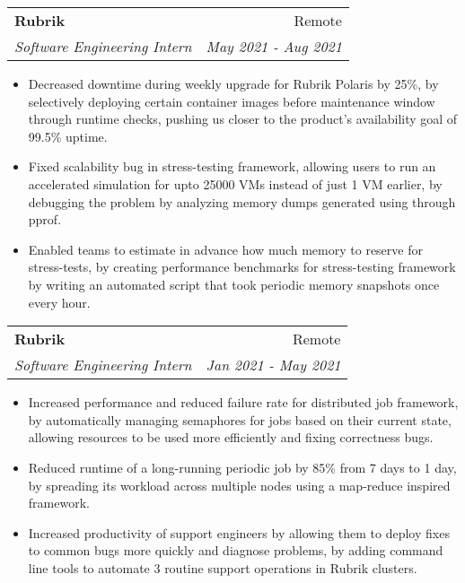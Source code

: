 \documentclass[letterpaper,11pt]{article}
\makeatletter
\newcommand{\resumeItemWithoutBold}[1]{
  \item\small{
    {#1 \vspace{-2pt}}
  }
}
\newcommand{\resumeSubheading}[4]{
  \vspace{-1pt}\item
    \begin{tabular*}{0.97\textwidth}{l@{\extracolsep{\fill}}r}
      \textbf{#1} & #2 \\
      \textit{\small#3} & \textit{\small #4} \\
    \end{tabular*}\vspace{-5pt}
}
\newcommand{\resumeItemListStart}{\begin{itemize}}
\newcommand{\resumeItemListEnd}{\end{itemize}\vspace{-5pt}}
\makeatother
\begin{document}
    \resumeSubheading
      {Rubrik}{Remote}
      {Software Engineering Intern}{May 2021 - Aug 2021}
      \resumeItemListStart
        \resumeItemWithoutBold
          {Decreased downtime during weekly upgrade for Rubrik Polaris by 25\%, by selectively deploying certain container images before maintenance window through runtime checks, pushing us closer to the product's availability goal of 99.5\% uptime.}
        \resumeItemWithoutBold
          {
            Fixed scalability bug in stress-testing framework, allowing users to run an accelerated simulation for upto 25000 VMs instead of just 1 VM earlier, by debugging the problem by analyzing memory dumps generated using through pprof.
          }
        \resumeItemWithoutBold
        {
          Enabled teams to estimate in advance how much memory to reserve for stress-tests, by creating performance benchmarks for stress-testing framework by writing an automated script that took periodic memory snapshots once every hour.
        }
      \resumeItemListEnd
      
    \resumeSubheading
      {Rubrik}{Remote}
      {Software Engineering Intern}{Jan 2021 - May 2021}
      \resumeItemListStart
        \resumeItemWithoutBold
        {
            Increased performance and reduced failure rate for distributed job framework, by automatically managing semaphores for jobs based on their current state, allowing resources to be used more efficiently and fixing correctness bugs. 
            \color{blue}
        }
        \resumeItemWithoutBold
        {
            Reduced runtime of a long-running periodic job by 85\% from 7 days to 1 day, by spreading its workload across multiple nodes using a map-reduce inspired framework.
        }
        \resumeItemWithoutBold
        {
            Increased productivity of support engineers by allowing them to deploy fixes to common bugs more quickly and diagnose problems, by adding command line tools to automate 3 routine support operations in Rubrik clusters.
        }
      \resumeItemListEnd

\end{document}

